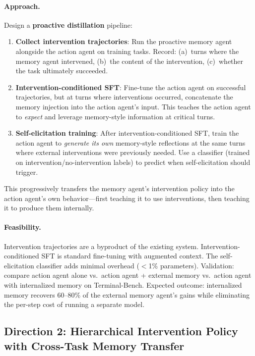 \documentclass[11pt,a4paper]{article}
\begin{document}
\paragraph{Approach.} Design a \textbf{proactive distillation} pipeline:
\begin{enumerate}
\item \textbf{Collect intervention trajectories}: Run the proactive memory agent alongside the action agent on training tasks. Record: (a)~turns where the memory agent intervened, (b)~the content of the intervention, (c)~whether the task ultimately succeeded.
\item \textbf{Intervention-conditioned SFT}: Fine-tune the action agent on successful trajectories, but at turns where interventions occurred, concatenate the memory injection into the action agent's input. This teaches the action agent to \emph{expect} and leverage memory-style information at critical turns.
\item \textbf{Self-elicitation training}: After intervention-conditioned SFT, train the action agent to \emph{generate its own} memory-style reflections at the same turns where external interventions were previously needed. Use a classifier (trained on intervention/no-intervention labels) to predict when self-elicitation should trigger.
\end{enumerate}
This progressively transfers the memory agent's intervention policy into the action agent's own behavior---first teaching it to use interventions, then teaching it to produce them internally.

\paragraph{Feasibility.} Intervention trajectories are a byproduct of the existing system. Intervention-conditioned SFT is standard fine-tuning with augmented context. The self-elicitation classifier adds minimal overhead ($<$1\% parameters). Validation: compare action agent alone vs.\ action agent + external memory vs.\ action agent with internalized memory on Terminal-Bench. Expected outcome: internalized memory recovers 60--80\% of the external memory agent's gains while eliminating the per-step cost of running a separate model.

\subsection{Direction 2: Hierarchical Intervention Policy with Cross-Task Memory Transfer}
\end{document}
